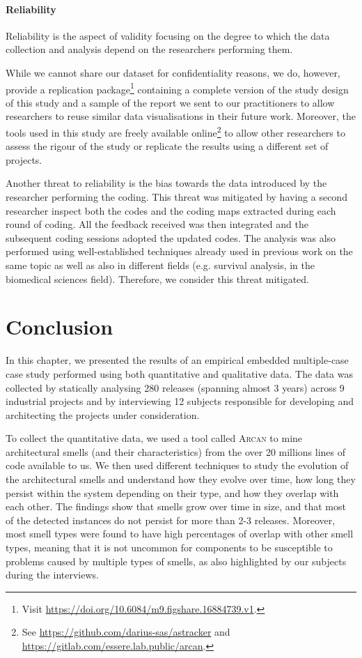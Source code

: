 \paragraph{Reliability}
Reliability is the aspect of validity focusing on the degree to which the data collection and analysis depend on the researchers performing them.

While we cannot share our dataset for confidentiality reasons, we do, however, provide a replication package\footnote{Visit \url{https://doi.org/10.6084/m9.figshare.16884739.v1}.} containing a complete version of the study design of this study and a sample of the report we sent to our practitioners to allow researchers to reuse similar data visualisations in their future work.
Moreover, the tools used in this study are freely available online\footnote{\label{fn:tools}See \url{https://github.com/darius-sas/astracker} and \url{https://gitlab.com/essere.lab.public/arcan}.} to allow other researchers to assess the rigour of the study or replicate the results using a different set of projects.

Another threat to reliability is the bias towards the data introduced by the researcher performing the coding.
This threat was mitigated by having a second researcher inspect both the codes and the coding maps extracted during each round of coding. All the feedback received was then integrated and the subsequent coding sessions adopted the updated codes.
The analysis was also performed using well-established techniques already used in previous work on the same topic as well as also in different fields (e.g. survival analysis, in the biomedical sciences field).
Therefore, we consider this threat mitigated.

\section{Conclusion}\label{c4:sec:conclusion-fw}
In this chapter, we presented the results of an empirical embedded multiple-case case study performed using both quantitative and qualitative data. 
The data was collected by statically analysing 280 releases (spanning almost 3 years) across 9 industrial projects and by interviewing 12 subjects responsible for developing and architecting the projects under consideration.

To collect the quantitative data, we used a tool called \textsc{Arcan} to mine architectural smells (and their characteristics) from the over 20 millions lines of code available to us.
We then used different techniques to study the evolution of the architectural smells and understand how they evolve over time, how long they persist within the system depending on their type, and how they overlap with each other.
The findings show that smells grow over time in size, and that most of the detected instances do not persist for more than 2-3 releases. 
Moreover, most smell types were found to have high percentages of overlap with other smell types, meaning that it is not uncommon for components to be susceptible to problems caused by multiple types of smells, as also highlighted by our subjects during the interviews.

